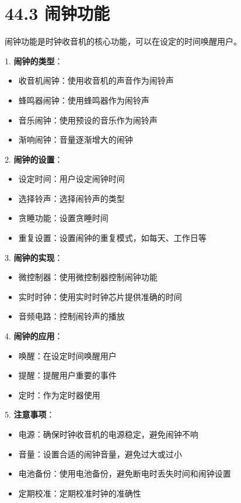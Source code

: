 \documentclass[12pt,UTF8]{ctexbook}
\begin{document}
\section*{44.3 闹钟功能}

闹钟功能是时钟收音机的核心功能，可以在设定的时间唤醒用户。

1. \textbf{闹钟的类型}：
   \begin{itemize}[leftmargin=3.5em]
   \item 收音机闹钟：使用收音机的声音作为闹铃声
   \item 蜂鸣器闹钟：使用蜂鸣器作为闹铃声
   \item 音乐闹钟：使用预设的音乐作为闹铃声
   \item 渐响闹钟：音量逐渐增大的闹钟
   \end{itemize}

2. \textbf{闹钟的设置}：
   \begin{itemize}[leftmargin=3.5em]
   \item 设定时间：用户设定闹钟时间
   \item 选择铃声：选择闹铃声的类型
   \item 贪睡功能：设置贪睡时间
   \item 重复设置：设置闹钟的重复模式，如每天、工作日等
   \end{itemize}

3. \textbf{闹钟的实现}：
   \begin{itemize}[leftmargin=3.5em]
   \item 微控制器：使用微控制器控制闹钟功能
   \item 实时时钟：使用实时时钟芯片提供准确的时间
   \item 音频电路：控制闹铃声的播放
   \end{itemize}

4. \textbf{闹钟的应用}：
   \begin{itemize}[leftmargin=3.5em]
   \item 唤醒：在设定时间唤醒用户
   \item 提醒：提醒用户重要的事件
   \item 定时：作为定时器使用
   \end{itemize}

5. \textbf{注意事项}：
   \begin{itemize}[leftmargin=3.5em]
   \item 电源：确保时钟收音机的电源稳定，避免闹钟不响
   \item 音量：设置合适的闹钟音量，避免过大或过小
   \item 电池备份：使用电池备份，避免断电时丢失时间和闹钟设置
   \item 定期校准：定期校准时钟的准确性
   \end{itemize}
\end{document}
